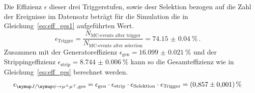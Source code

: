 %
Die Effizienz $\epsilon$ dieser drei Triggerstufen, sowie desr Selektion bezogen auf die Zahl der Ereignisse im Datensatz beträgt für die Simulation die in Gleichung~\eqref{eq:eff_ges1} aufgeführten Wert.
%
\begin{equation}
  \epsilon_\text{Trigger}=\frac{N_\text{MC-events after trigger}}{N_\text{MC-events after selection}}=\SI{74.15(4)}{\percent} \, .%
  \label{eq:eff_ges1}
\end{equation}
%
Zusammen mit der Generatoreffizienz $\epsilon_\text{gen}=\SI{16.099(21)}{\percent}$ und der Strippingeffizienz $\epsilon_\text{strip}=\SI{8.744(6)}{\percent}$ kann so die Gesamteffizienz wie in Gleichung~\eqref{eq:eff_ges} berechnet werden.
%
\begin{equation}
  \epsilon_{\kontroll, \text{ges}}
  =\epsilon_\text{gen}\cdot\epsilon_\text{strip}\cdot\epsilon_\text{Selektion}\cdot\epsilon_\text{Trigger}=\SI{0.857(1)}{\percent}
  \label{eq:eff_ges}
\end{equation}
